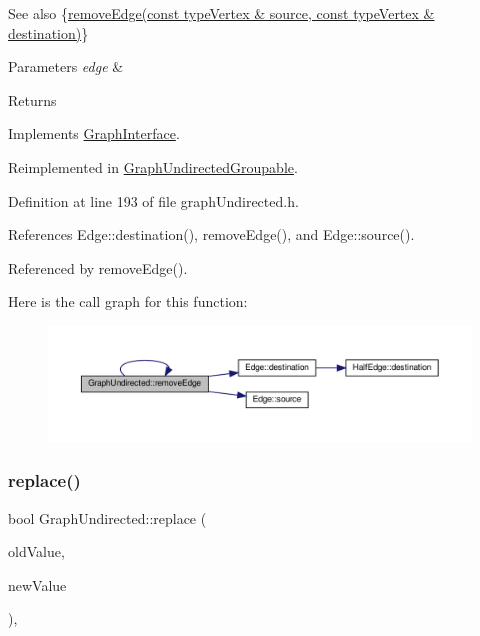 \begin{DoxySeeAlso}{See also}
\{\hyperlink{classGraphUndirected_af4a40541132a66c9b688a20958057751}{remove\+Edge(const type\+Vertex \& source, const type\+Vertex \& destination)}\} 
\end{DoxySeeAlso}

\begin{DoxyParams}{Parameters}
{\em edge} & \\
\hline
\end{DoxyParams}
\begin{DoxyReturn}{Returns}

\end{DoxyReturn}


Implements \hyperlink{classGraphInterface_a954e2d16f474cce832f02d4495df3092}{Graph\+Interface}.



Reimplemented in \hyperlink{classGraphUndirectedGroupable_a88e02e4e05f304b289558922f1cb6aa1}{Graph\+Undirected\+Groupable}.



Definition at line 193 of file graph\+Undirected.\+h.



References Edge\+::destination(), remove\+Edge(), and Edge\+::source().



Referenced by remove\+Edge().

Here is the call graph for this function\+:\nopagebreak
\begin{figure}[H]
\begin{center}
\leavevmode
\includegraphics[width=350pt]{classGraphUndirected_ad39275e7a8f7a39734916b8c5400a1d6_cgraph}
\end{center}
\end{figure}
\mbox{\label{classGraphUndirected_aee3bc279ffe39f8efb7dd60865279474}} 
\subsubsection{\texorpdfstring{replace()}{replace()}}
{\footnotesize\ttfamily bool Graph\+Undirected\+::replace (\begin{DoxyParamCaption}\item[{const \hyperlink{edge_8h_a5fbd20c46956d479cb10afc9855223f6}{type\+Vertex} \&}]{old\+Value,  }\item[{const \hyperlink{edge_8h_a5fbd20c46956d479cb10afc9855223f6}{type\+Vertex} \&}]{new\+Value }\end{DoxyParamCaption})\hspace{0.3cm}{\ttfamily [inline]}, {\ttfamily [virtual]}}


